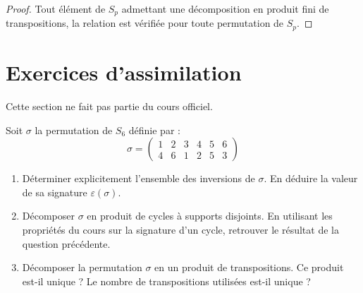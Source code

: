 \documentclass[12pt, a4paper]{report}
\begin{document}
\begin{proof}
    Tout élément de $S_p$ admettant une décomposition en produit fini de transpositions, la relation est vérifiée pour toute permutation de $S_p$.
\end{proof}

\chapter*{Exercices d'assimilation}

Cette section ne fait pas partie du cours officiel.

\begin{exercise}
    Soit $\sigma$ la permutation de $S_6$ définie par :
    $$\sigma = \begin{pmatrix} 1 & 2 & 3 & 4 & 5 & 6 \\ 4 & 6 & 1 & 2 & 5 & 3 \end{pmatrix}$$
    
    \begin{enumerate}
        \item Déterminer explicitement l'ensemble des inversions de $\sigma$. En déduire la valeur de sa signature $\varepsilon(\sigma)$.
        \item Décomposer $\sigma$ en produit de cycles à supports disjoints. En utilisant les propriétés du cours sur la signature d'un cycle, retrouver le résultat de la question précédente.
        \item Décomposer la permutation $\sigma$ en un produit de transpositions. Ce produit est-il unique ? Le nombre de transpositions utilisées est-il unique ?
    \end{enumerate}
\end{exercise}
\end{document}
